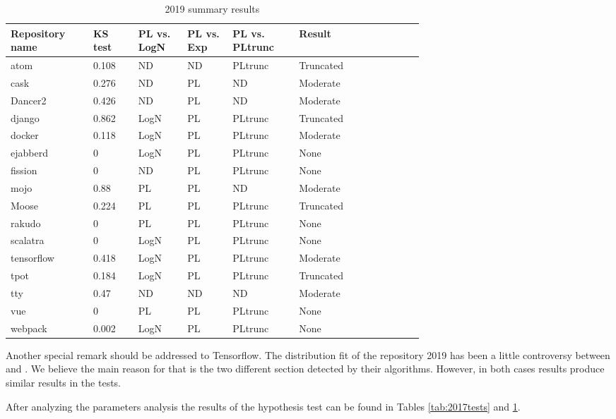 \documentclass[conference]{IEEEtran}
\begin{document}
\begin{table}[h!tbp]
	\caption{2019 summary results}
	\begin{center}
		\begin{tabular}{| p{0.12\linewidth} | p{0.08\linewidth} | p{0.08\linewidth} | p{0.08\linewidth} | p{0.1\linewidth} |p{0.13\linewidth} | p{0.09\linewidth} |}
			\hline
			Repository name & KS test & PL vs. LogN & PL vs. Exp & PL vs. PLtrunc & Result \\ 
			\hline
			atom &0.108 &ND &ND &PLtrunc & Truncated \\
			cask &0.276 &ND &PL &ND & Moderate \\
			Dancer2 &0.426 &ND &PL &ND & Moderate \\
			django &0.862 &LogN &PL &PLtrunc &Truncated \\
			docker &0.118 &LogN &PL &PLtrunc & Moderate \\
			ejabberd &0 &LogN &PL &PLtrunc & None\\
			fission &0 &ND &PL &PLtrunc & None \\
			mojo &0.88 &PL &PL &ND &Moderate \\
			Moose &0.224 &PL &PL &PLtrunc &Truncated \\
			rakudo &0 &PL &PL &PLtrunc & None \\
			scalatra &0 &LogN &PL &PLtrunc & None \\
			tensorflow &0.418 &LogN &PL &PLtrunc & Moderate \\
			tpot &0.184 &LogN &PL &PLtrunc & Truncated \\
			tty &0.47 &ND &ND &ND & Moderate \\
			vue &0 &PL &PL &PLtrunc & None \\
			webpack &0.002 &LogN &PL &PLtrunc & None\\
			\hline
		\end{tabular}
	\end{center}
\label{tab:2019tests}
\end{table}
%
Another special remark should be addressed to Tensorflow. The
distribution fit of the repository 2019 has been a little controversy
between \cite{alstott2014powerlaw} and \cite{gillespie2015power}. We
believe the main reason for that is the two different section detected
by their algorithms. However, in both cases results produce similar
results in the tests. %

After analyzing the parameters analysis %
the results of the hypothesis
test can be found in Tables \ref{tab:2017tests} and
\ref{tab:2019tests}.  
\end{document}
